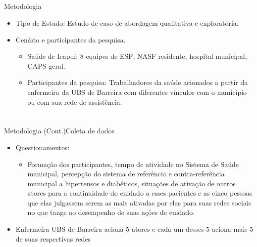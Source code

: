 \documentclass[10pt]{beamer}
\begin{document}
\subsection{}
\begin{frame}{Metodologia}{}
  \begin{itemize}
    \item Tipo de Estudo: Estudo de caso de abordagem qualitativa e exploratória.
    \item Cenário e participantes da pesquisa.
    \begin{itemize}
    		\item Saúde de Icapuí: 8 equipes de ESF, NASF residente, hospital municipal, CAPS geral.
            \item Participantes da pesquisa: Trabalhadores da saúde acionados a partir da enfermeira da UBS de Barreira com diferentes vínculos com o município ou com sua rede de assistência. 
    \end{itemize}
  \end{itemize}
\end{frame}

\section{}
\subsection{}
\begin{frame}{Metodologia (Cont.)}{Coleta de dados}
  \begin{itemize}
	\item Questionamentos: 
	\begin{itemize}
    	\item Formação dos participantes, tempo de atividade no Sistema de Saúde municipal, percepção do sistema de referência e contra-referência municipal a hipertensos e diabéticos, situações de ativação de outros atores para a continuidade do cuidado a esses pacientes e as cinco pessoas que elas julgassem serem as mais ativadas por elas para suas redes sociais no que tange ao desempenho de suas ações de cuidado.
     \end{itemize}
     \item  Enfermeira UBS de Barreira aciona 5 atores e cada um desses 5 aciona mais 5 de suas respectivas redes 
  \end{itemize}
\end{frame}
\end{document}
